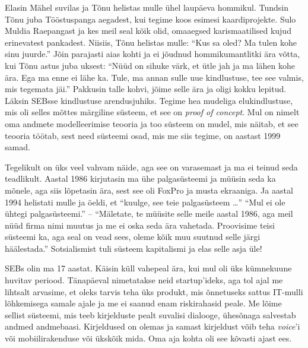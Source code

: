 Elasin Mähel suvilas ja Tõnu helistas mulle ühel laupäeva hommikul. Tundsin Tõnu 
juba Tööstuspanga aegadest, kui tegime koos esimesi kaardiprojekte. 
Sulo Muldia Raepangast ja kes meil seal kõik olid, omaaegsed 
karismaatilised kujud erinevatest pankadest. Niisiis, Tõnu helistas mulle: \enquote{Kus sa oled? Ma tulen kohe sinu juurde.} Jõin parajasti aias kohti ja ei jõudnud hommikumantlitki ära võtta, kui
Tõnu astus juba uksest: \enquote{Nüüd on sihuke värk, et 
ütle jah ja ma lähen kohe ära. Ega ma enne ei lähe ka. Tule, ma annan 
sulle uue kindlustuse, tee see valmis, mis tegemata jäi.} Pakkusin talle kohvi, 
jõime selle ära ja oligi kokku lepitud. Läksin SEBsse kindlustuse 
arendusjuhiks. Tegime hea mudeliga elukindlustuse, mis oli 
selles mõttes märgiline süsteem, et see on \emph{proof of concept}. 
Mul on nimelt oma andmete modelleerimise teooria ja too süsteem on mudel, mis 
näitab, et see teooria töötab, sest need süsteemi osad, mis me siis tegime, on 
aastast 1999 samad. 


Tegelikult on üks veel vahvam näide, aga see on varasemast ja ma ei teinud seda 
teadlikult. Aastal 1986 kirjutasin ma ühe palgasüsteemi ja müüsin seda ka 
mõnele, aga siis lõpetasin ära, sest see oli FoxPro ja musta ekraaniga. Ja aastal 1994 
helistati mulle ja öeldi, et \enquote{kuulge, see teie palgasüsteem \ldots} 
\enquote{Mul ei ole ühtegi palgasüsteemi.} -- \enquote{Mäletate, te müüsite selle meile aastal 1986, aga meil nüüd firma nimi muutus ja me ei oska seda ära vahetada. Proovisime
teisi süsteemi ka, aga seal on vead sees, oleme kõik muu suutnud selle järgi 
häälestada.} Sotsialismist tuli süsteem kapitalismi ja elas selle asja üle! 


SEBs olin ma 17 aastat. Käisin küll 
vahepeal ära, kui mul oli üks kümnekuune huvitav periood. Tänapäeval nimetatakse 
neid startup'ideks, aga tol ajal me lihtsalt arvasime, et oleks tarvis teha üks 
produkt, mis õnnetuseks sattus IT-mulli lõhkemisega samale ajale ja me ei 
saanud enam riskirahasid peale. Me lõime sellist süsteemi, mis teeb kirjelduste 
pealt suvalisi dialooge, ühesõnaga salvestab andmed andmebaasi. 
Kirjeldused on olemas ja samast kirjeldust võib teha \emph{voice}'i või 
mobiilirakenduse või ükskõik mida. Oma aja kohta 
oli see kõvasti ajast ees.

